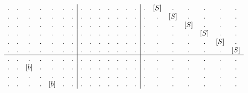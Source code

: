 \begin{example}
\begin{align}
\begin{array}{c c c c c c c | c c c c c c c | c c c c c c c }
. & . & .            & . & .               & . & .                            &         . & .   & . & .             & . & .                & .         &           .   & [S]         & .   & .              & .   & .                 & . \\
. & . & .            & . & .               & . & .                            &         . & .   & . & .             & . & .                & .         &           .   & .           & [S] & .              & .   & .                 & . \\
. & . & .            & . & .               & . & .                            &         . & .   & . & .             & . & .                & .         &           .   & .           & .   & [S]            & .   & .                 & . \\
. & . & .            & . & .               & . & .                            &         . & .   & . & .             & . & .                & .         &           .   & .           & .   & .              & [S] & .                 & . \\
. & . & .            & . & .               & . & .                            &         . & .   & . & .             & . & .                & .         &           .   & .           & .   & .              & .   & [S]               & . \\
. & . & .            & . & .               & . & .                            &         . & .   & . & .             & . & .                & .         &           .   & .           & .   & .              & .   & .                 & [S] \\
\hline                                                                                              
. & . & .            & . & .               & . & .                            &         . & .   & . & .             & . & .                & .         &           .   & .           & .   & .              & .   & .                 & . \\
. & . & [b]          & . & .               & . & .                            &         . & .   & . & .             & . & .                & .         &           .   & .           & .   & .              & .   & .                 & . \\
. & . & .            & . & .               & . & .                            &         . & .   & . & .             & . & .                & .         &           .   & .           & .   & .              & .   & .                 & . \\
. & . & .            & . & [b]             & . & .                            &         . & .   & . & .             & . & .                & .         &           .   & .           & .   & .              & .   & .                 & . \\

\end{array}
\end{align}
\end{example}
